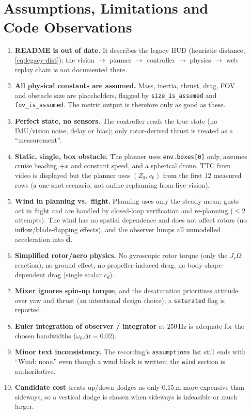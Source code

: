 \documentclass[11pt,a4paper]{article}
\newcommand{\vc}[1]{\bm{#1}}
\newcommand{\code}[1]{\texttt{\small #1}}
\newcommand{\hatv}[1]{\widehat{#1}}
\begin{document}
\section{Assumptions, Limitations and Code Observations}\label{sec:limits}
\begin{enumerate}
\item \textbf{README is out of date.} It describes the legacy HUD (heuristic distance, \eqref{eq:legacy-dist}); the vision $\to$ planner $\to$ controller $\to$ physics $\to$ web replay chain is not documented there.
\item \textbf{All physical constants are assumed.} Mass, inertia, thrust, drag, FOV and obstacle size are placeholders, flagged by \code{size\_is\_assumed} and \code{fov\_is\_assumed}. The metric output is therefore only as good as these.
\item \textbf{Perfect state, no sensors.} The controller reads the true state (no IMU/vision noise, delay or bias); only rotor-derived thrust is treated as a ``measurement''.
\item \textbf{Static, single, box obstacle.} The planner uses \code{env.boxes[0]} only, assumes cruise heading $+x$ and constant speed, and a spherical drone. TTC from video is displayed but the planner uses $(Z_0,v_0)$ from the first 12 measured rows (a one-shot scenario, not online replanning from live vision).
\item \textbf{Wind in planning vs.\ flight.} Planning uses only the steady mean; gusts act in flight and are handled by closed-loop verification and re-planning ($\le2$ attempts). The wind has no spatial dependence and does not affect rotors (no inflow/blade-flapping effects), and the observer lumps all unmodelled acceleration into $\hatv{\vc d}$.
\item \textbf{Simplified rotor/aero physics.} No gyroscopic rotor torque (only the $J_r\dot\Omega$ reaction), no ground effect, no propeller-induced drag, no body-shape-dependent drag (single scalar $c_d$).
\item \textbf{Mixer ignores spin-up torque}, and the desaturation prioritises attitude over yaw and thrust (an intentional design choice); a \code{saturated} flag is reported.
\item \textbf{Euler integration of observer / integrator} at $250$\,Hz is adequate for the chosen bandwidths ($\omega_0\Delta t=0.02$).
\item \textbf{Minor text inconsistency.} The recording's \code{assumptions} list still ends with ``Wind: none.'' even though a wind block is written; the \code{wind} section is authoritative.
\item \textbf{Candidate cost} treats up/down dodges as only $0.15$\,m more expensive than sideways, so a vertical dodge is chosen when sideways is infeasible or much larger.
\end{enumerate}
\end{document}
